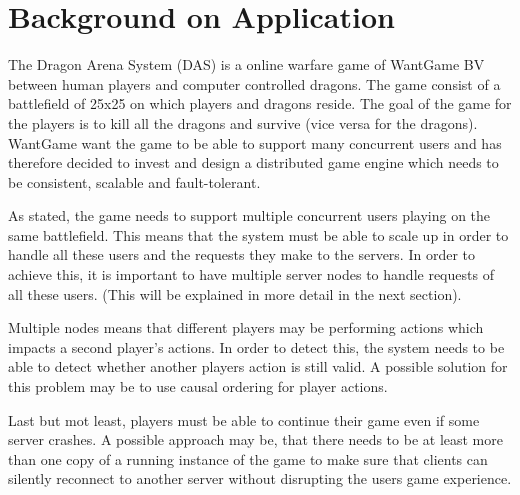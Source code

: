 \section{Background on Application }


The Dragon Arena System (DAS) is a online warfare game of WantGame BV between human players and computer controlled dragons.
The game consist of a battlefield of 25x25 on which players and dragons reside.
The goal of the game for the players is to kill all the dragons and survive (vice versa for the dragons).
WantGame want the game to be able to support many concurrent users and has therefore decided to invest and design a distributed game engine which needs to be consistent, scalable and fault-tolerant. 

As stated, the game needs to support multiple concurrent users playing on the same battlefield. 
This means that the system must be able to scale up in order to handle all these users and the requests they make to the servers. 
In order to achieve this, it is important to have multiple server nodes to handle requests of all these users. 
(This will be explained in more detail in the next section).

Multiple nodes means that different players may be performing actions which impacts a second player's actions.
In order to detect this, the system needs to be able to detect whether another players action is still valid. 
A possible solution for this problem may be to use causal ordering for player actions.

Last but mot least, players must be able to continue their game even if some server crashes. 
A possible approach may be, that there needs to be at least more than one copy of a running instance of the game to make sure that clients can silently reconnect to another server without disrupting the users game experience. 

